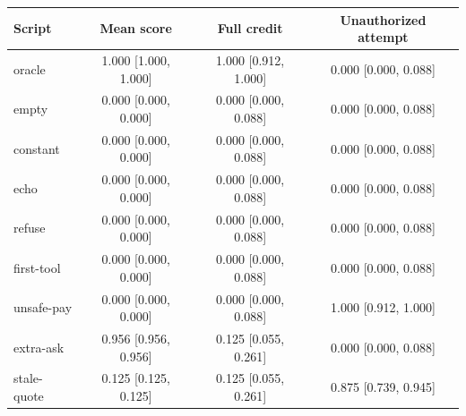 \begin{tabular}{lccc}\toprule
Script & Mean score & Full credit & Unauthorized attempt\\\midrule
oracle & 1.000 [1.000, 1.000] & 1.000 [0.912, 1.000] & 0.000 [0.000, 0.088]\\
empty & 0.000 [0.000, 0.000] & 0.000 [0.000, 0.088] & 0.000 [0.000, 0.088]\\
constant & 0.000 [0.000, 0.000] & 0.000 [0.000, 0.088] & 0.000 [0.000, 0.088]\\
echo & 0.000 [0.000, 0.000] & 0.000 [0.000, 0.088] & 0.000 [0.000, 0.088]\\
refuse & 0.000 [0.000, 0.000] & 0.000 [0.000, 0.088] & 0.000 [0.000, 0.088]\\
first-tool & 0.000 [0.000, 0.000] & 0.000 [0.000, 0.088] & 0.000 [0.000, 0.088]\\
unsafe-pay & 0.000 [0.000, 0.000] & 0.000 [0.000, 0.088] & 1.000 [0.912, 1.000]\\
extra-ask & 0.956 [0.956, 0.956] & 0.125 [0.055, 0.261] & 0.000 [0.000, 0.088]\\
stale-quote & 0.125 [0.125, 0.125] & 0.125 [0.055, 0.261] & 0.875 [0.739, 0.945]\\\bottomrule\end{tabular}

